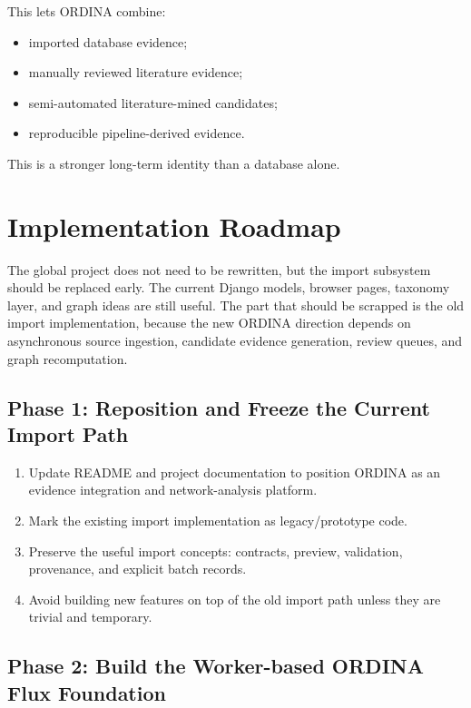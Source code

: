 \documentclass[11pt,a4paper]{article}
\begin{document}
This lets ORDINA combine:

\begin{itemize}[noitemsep]
    \item imported database evidence;
    \item manually reviewed literature evidence;
    \item semi-automated literature-mined candidates;
    \item reproducible pipeline-derived evidence.
\end{itemize}

This is a stronger long-term identity than a database alone.

\section{Implementation Roadmap}

The global project does not need to be rewritten, but the import subsystem should be replaced early. The current Django models, browser pages, taxonomy layer, and graph ideas are still useful. The part that should be scrapped is the old import implementation, because the new ORDINA direction depends on asynchronous source ingestion, candidate evidence generation, review queues, and graph recomputation.

\subsection{Phase 1: Reposition and Freeze the Current Import Path}

\begin{enumerate}[noitemsep]
    \item Update README and project documentation to position ORDINA as an evidence integration and network-analysis platform.
    \item Mark the existing import implementation as legacy/prototype code.
    \item Preserve the useful import concepts: contracts, preview, validation, provenance, and explicit batch records.
    \item Avoid building new features on top of the old import path unless they are trivial and temporary.
\end{enumerate}

\subsection{Phase 2: Build the Worker-based ORDINA Flux Foundation}
\end{document}
